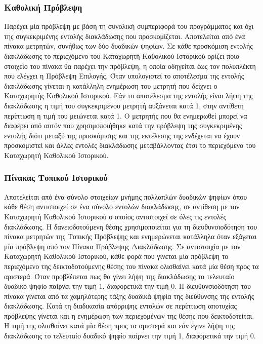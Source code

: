 \subsubsection*{Καθολική Πρόβλεψη}
\label{chap2_GlobalPrediction}

Παρέχει μία πρόβλεψη με βάση τη συνολική συμπεριφορά του προγράμματος και όχι της συγκεκριμένης εντολής διακλάδωσης που προσκομίζεται. Αποτελείται από ένα πίνακα μετρητών, συνήθως των δύο δυαδικών ψηφίων. Σε κάθε προσκόμιση εντολής διακλάδωσης το περιεχόμενο του Καταχωρητή Καθολικού Ιστορικού ορίζει ποιο στοιχείο του πίνακα θα παρέχει την πρόβλεψη, η οποία οδηγείται έως τον πολυπλέκτη που ελέγχει η Πρόβλεψη Επιλογής. Όταν υπολογιστεί το αποτέλεσμα της εντολής διακλάδωσης γίνεται η κατάλληλη ενημέρωση του μετρητή που δείχνει ο Καταχωρητής Καθολικού Ιστορικού. Εάν το αποτέλεσμα της εντολής είναι λήψη της διακλάδωσης η τιμή του συγκεκριμένου μετρητή αυξάνεται κατά 1, στην αντίθετη περίπτωση η τιμή του μειώνεται κατά 1. Ο μετρητής που θα ενημερωθεί μπορεί να διαφέρει από αυτόν που χρησιμοποιήθηκε κατά την πρόβλεψη της συγκεκριμένης εντολής διότι μεταξύ της προσκόμισης και της εκτέλεσης της ενδέχεται να έχουν προσκομιστεί και άλλες εντολές διακλάδωσης μεταβάλλοντας έτσι το περιεχόμενο του Καταχωρητή Καθολικού Ιστορικού.

\subsubsection*{Πίνακας Τοπικού Ιστορικού}
\label{chap2_LocalHistoryTable}

Αποτελείται από ένα σύνολο στοιχείων μνήμης πολλαπλών δυαδικών ψηφίων όπου κάθε θέση αντιστοιχεί σε ένα σύνολο εντολών διακλάδωσης, σε αντίθεση με τον Καταχωρητή Καθολικού Ιστορικού ο οποίος αντιστοιχεί σε όλες τις εντολές διακλάδωσης. Η δανειοδοτούμενη θέσης χρησιμοποιείται για τη διευθυνσιοδότηση του πίνακα μετρητών της Τοπικής Πρόβλεψης και ενημερώνεται κατάλληλα όταν εξάγεται μία πρόβλεψη από τον Πίνακα Πρόβλεψης Διακλάδωσης. Σε αντιστοιχία με τον Καταχωρητή Καθολικού Ιστορικού, κάθε φορά που γίνεται μία πρόβλεψη το περιεχόμενο της δεικτοδοτούμενης θέσης του πίνακα ολισθαίνει κατά μία θέση προς τα αριστερά. Όταν προβλέπεται πως θα γίνει λήψη της διακλάδωσης το τελευταίο δυαδικό ψηφίο παίρνει την τιμή 1, διαφορετικά την τιμή 0. Η διευθυνσιοδότηση του πίνακα γίνεται από τα χαμηλότερης τάξης δυαδικά ψηφία της διεύθυνσης της εντολής διακλάδωσης. Κατά τη διαδικασία απόρριψης εντολών σε περίπτωση αποτυχίας πρόβλεψης γίνεται και η ενημέρωση των περιεχομένων της θέσης που δεικτοδοτείται. Η τιμή της ολισθαίνει κατά μία θέση προς τα αριστερά και εάν έγινε λήψη της διακλάδωσης το τελευταίο δυαδικό ψηφίο παίρνει την τιμή 1, διαφορετικά την τιμή 0.

